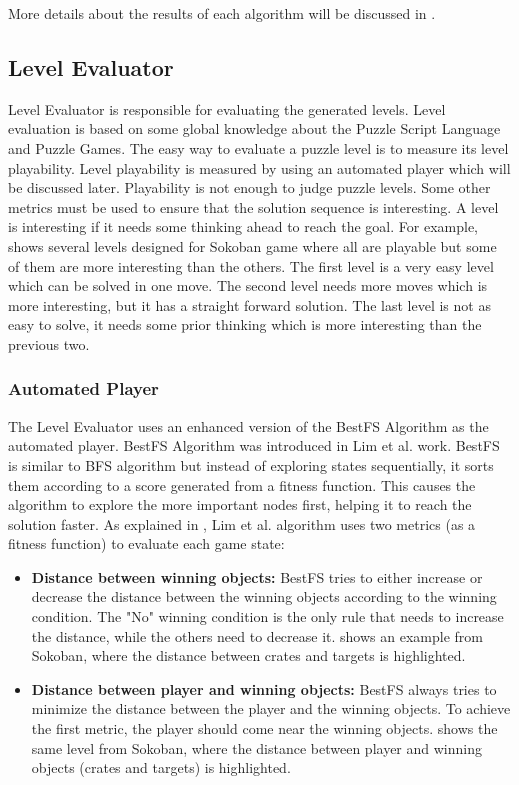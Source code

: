 More details about the results of each algorithm will be discussed in .

\subsection{Level Evaluator}
Level Evaluator is responsible for evaluating the generated levels. Level evaluation is based on some global knowledge about the Puzzle Script Language and Puzzle Games. The easy way to evaluate a puzzle level is to measure its level playability. Level playability is measured by using an automated player which will be discussed later. Playability is not enough to judge puzzle levels. Some other metrics must be used to ensure that the solution sequence is interesting. A level is interesting if it needs some thinking ahead to reach the goal. For example,  shows several levels designed for Sokoban game where all are playable but some of them are more interesting than the others. The first level is a very easy level which can be solved in one move. The second level needs more moves which is more interesting, but it has a straight forward solution. The last level is not as easy to solve, it needs some prior thinking which is more interesting than the previous two.


\subsubsection{Automated Player}
The Level Evaluator uses an enhanced version of the BestFS Algorithm as the automated player. BestFS Algorithm was introduced in Lim et al.\cite{puzzleScriptGeneration} work. BestFS is similar to BFS algorithm but instead of exploring states sequentially, it sorts them according to a score generated from a fitness function. This causes the algorithm to explore the more important nodes first, helping it to reach the solution faster. As explained in , Lim et al. algorithm uses two metrics (as a fitness function) to evaluate each game state:
\begin{itemize} \itemsep0pt \parskip0pt 
	\item \textbf{Distance between winning objects:} BestFS tries to either increase or decrease the distance between the winning objects according to the winning condition. The "No" winning condition is the only rule that needs to increase the distance, while the others need to decrease it.  shows an example from Sokoban, where the distance between crates and targets is highlighted.
	\item \textbf{Distance between player and winning objects:} BestFS always tries to minimize the distance between the player and the winning objects. To achieve the first metric, the player should come near the winning objects.  shows the same level from Sokoban, where the distance between player and winning objects (crates and targets) is highlighted.
\end{itemize}

